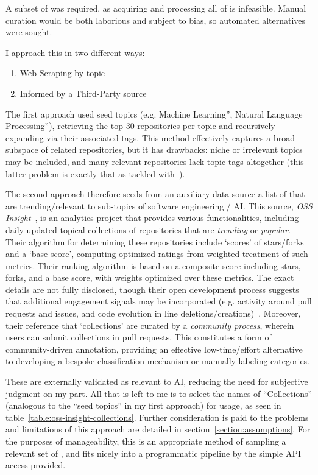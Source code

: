A subset of \repos{} was required, as acquiring and processing all of \gh{} is infeasible.
Manual curation would be both laborious and subject to bias, so automated alternatives were sought.

I approach this in two different ways:
\begin{enumerate}
    \item Web Scraping by \gh{} topic
    \item Informed by a Third-Party source
\end{enumerate}
The first approach used seed topics (e.g. Machine Learning'', Natural Language Processing''), retrieving the top 30 repositories per topic and recursively expanding via their associated tags.
This method effectively captures a broad subspace of related repositories, but it has drawbacks: niche or irrelevant topics may be included, and many relevant repositories lack topic tags altogether (this latter problem is exactly that as tackled with~\cite{izadi_2021_TopicRecommendation}).

The second approach therefore seeds from an auxiliary data source a list of \repos{} that are trending/relevant to sub-topics of software engineering / AI.
This source, \emph{OSS Insight}~\cite{__OSSInsight}, is an analytics project that provides various functionalities, including daily-updated topical collections of repositories that are \emph{trending} or \emph{popular}.
Their algorithm for determining these repositories include `scores' of stars/forks and a `base score', computing optimized ratings from weighted treatment of such metrics.
Their ranking algorithm is based on a composite score including stars, forks, and a base score, with weights optimized over these metrics. The exact details are not fully disclosed, though their open development process suggests that additional engagement signals may be incorporated (e.g. activity around pull requests and issues, and code evolution in line deletions/creations)~\cite{__WeAre}.
Moreover, their \ghrepo{} reference that `collections' are curated by a \emph{community process}, wherein users can submit collections in pull requests. This constitutes a form of community-driven annotation, providing an effective low-time/effort alternative to developing a bespoke classification mechanism or manually labeling categories.

These \repos{} are externally validated as relevant to AI, reducing the need for subjective judgment on my part. All that is left to me is to select the names of ``Collections'' (analogous to the ``seed topics'' in my first approach) for usage, as seen in table~\ref{table:oss-insight-collections}.
Further consideration is paid to the problems and limitations of this approach are detailed in section~\ref{section:assumptions}.
For the purposes of manageability, this is an appropriate method of sampling a relevant set of \repos{}, and fits nicely into a programmatic pipeline by the simple API access provided.

